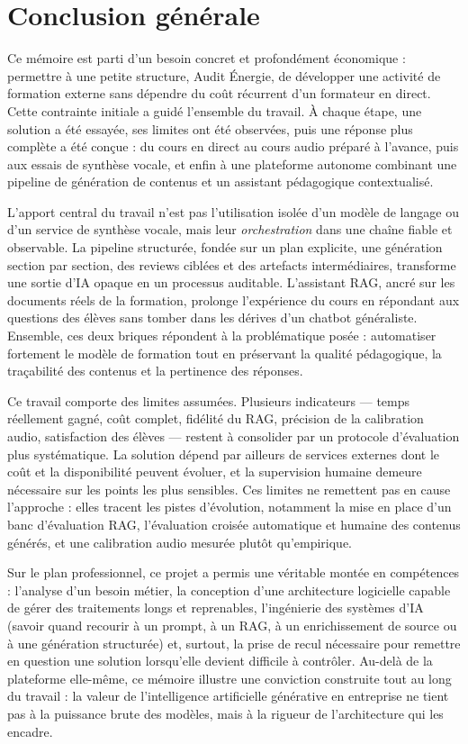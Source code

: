 \section*{Conclusion générale}

Ce mémoire est parti d'un besoin concret et profondément économique : permettre à une
petite structure, Audit Énergie, de développer une activité de formation externe sans dépendre
du coût récurrent d'un formateur en direct. Cette contrainte initiale a guidé l'ensemble du
travail. À chaque étape, une solution a été essayée, ses limites ont été observées, puis une
réponse plus complète a été conçue : du cours en direct au cours audio préparé à l'avance, puis
aux essais de synthèse vocale, et enfin à une plateforme autonome combinant une pipeline de
génération de contenus et un assistant pédagogique contextualisé.

L'apport central du travail n'est pas l'utilisation isolée d'un modèle de langage ou d'un service
de synthèse vocale, mais leur \emph{orchestration} dans une chaîne fiable et observable. La
pipeline structurée, fondée sur un plan explicite, une génération section par section, des
reviews ciblées et des artefacts intermédiaires, transforme une sortie d'IA opaque en un
processus auditable. L'assistant RAG, ancré sur les documents réels de la formation, prolonge
l'expérience du cours en répondant aux questions des élèves sans tomber dans les dérives d'un
chatbot généraliste. Ensemble, ces deux briques répondent à la problématique posée :
automatiser fortement le modèle de formation tout en préservant la qualité pédagogique, la
traçabilité des contenus et la pertinence des réponses.

Ce travail comporte des limites assumées. Plusieurs indicateurs — temps réellement gagné,
coût complet, fidélité du RAG, précision de la calibration audio, satisfaction des élèves —
restent à consolider par un protocole d'évaluation plus systématique. La solution dépend par
ailleurs de services externes dont le coût et la disponibilité peuvent évoluer, et la supervision
humaine demeure nécessaire sur les points les plus sensibles. Ces limites ne remettent pas en
cause l'approche : elles tracent les pistes d'évolution, notamment la mise en place d'un banc
d'évaluation RAG, l'évaluation croisée automatique et humaine des contenus générés, et une
calibration audio mesurée plutôt qu'empirique.

Sur le plan professionnel, ce projet a permis une véritable montée en compétences :
l'analyse d'un besoin métier, la conception d'une architecture logicielle capable de gérer des
traitements longs et reprenables, l'ingénierie des systèmes d'IA (savoir quand recourir à un
prompt, à un RAG, à un enrichissement de source ou à une génération structurée) et, surtout,
la prise de recul nécessaire pour remettre en question une solution lorsqu'elle devient
difficile à contrôler. Au-delà de la plateforme elle-même, ce mémoire illustre une conviction
construite tout au long du travail : la valeur de l'intelligence artificielle générative en
entreprise ne tient pas à la puissance brute des modèles, mais à la rigueur de l'architecture
qui les encadre.
